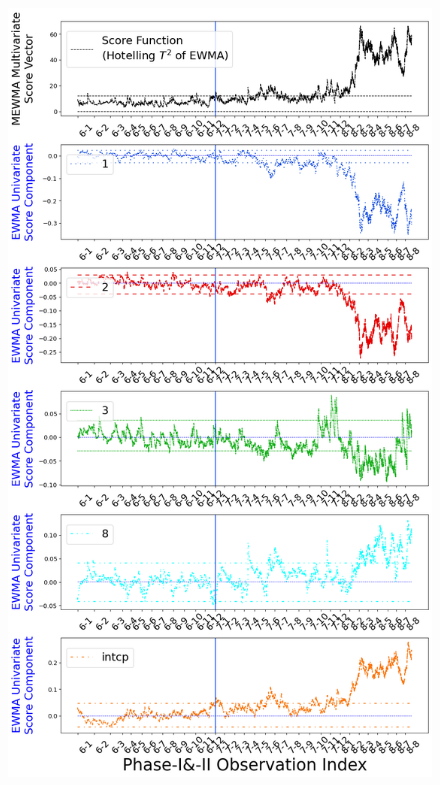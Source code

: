 \documentclass[twoside,11pt]{article}
\begin{document}

\begin{figure}[H]
\centering
\includegraphics[width = 0.48\linewidth]{../figures/v14/credit_default/logi_scal_PI_train_sample_weights/pos_single_credit_mlines_with_regu_1e-08_0_0001_0_001_99_0.png}

\end{figure}
\end{document}
